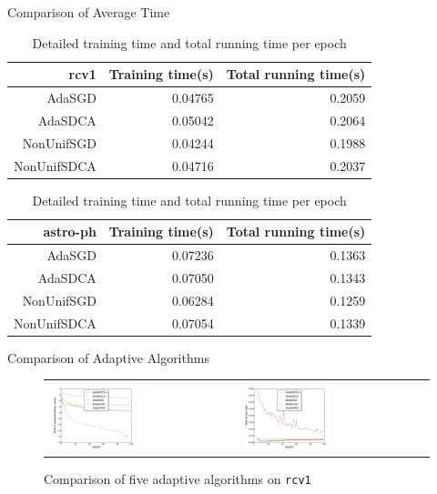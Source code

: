\begin{frame}{Comparison of Average Time}
\begin{table}[htbp]
    \centering
    \caption{Detailed training time and total running time per epoch}
    \label{table:rcv1_time}
    \begin{tabular}{|r|r|r|}
        \hline 
        rcv1 & Training time(s) & Total running time(s) \\
        \hline
        AdaSGD & 0.04765 & 0.2059 \\
        \hline
        AdaSDCA & 0.05042 & 0.2064 \\
        \hline
        NonUnifSGD & 0.04244 & 0.1988 \\
        \hline
        NonUnifSDCA  & 0.04716 & 0.2037 \\
	\hline
    \end{tabular}
    \label{table:astro-ph_time}
    \begin{tabular}{|r|r|r|}
        \hline 
        astro-ph &  Training time(s) & Total running time(s) \\
        \hline
        AdaSGD & 0.07236 & 0.1363 \\
        \hline
        AdaSDCA & 0.07050 & 0.1343 \\
        \hline
        NonUnifSGD & 0.06284 & 0.1259 \\
        \hline
        NonUnifSDCA  & 0.07054 & 0.1339 \\
        \hline
    \end{tabular}
\end{table}
\end{frame}

\begin{frame}{Comparison of Adaptive Algorithms}
\begin{figure}[htbp]
\begin{tabular}{ll}
    \centering
        \includegraphics[width=0.5\textwidth]{images/comp_adas_obej.pdf} &
        \includegraphics[width=0.5\textwidth]{images/comp_adas_terror.pdf}
        \end{tabular}
    \caption{Comparison of five adaptive algorithms on \texttt{rcv1}} 
    \label{fig:ada_all1}
\end{figure}
\end{frame}

